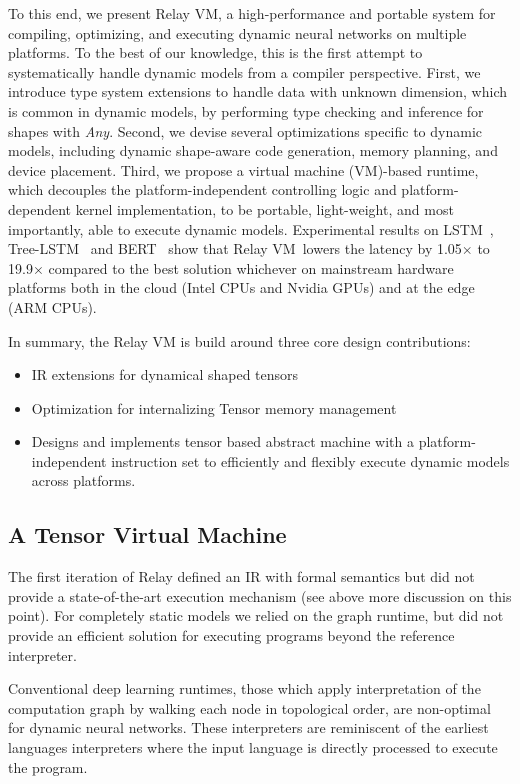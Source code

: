 To this end, we present Relay VM, a high-performance and portable system for compiling, optimizing,
  and executing dynamic neural networks on multiple platforms.
To the best of our knowledge, this is the first attempt to systematically handle dynamic models from a compiler perspective.
First, we introduce type system extensions to handle data with unknown dimension,
  which is common in dynamic models,
  by performing type checking and inference for shapes with {\em Any}.
Second, we devise several optimizations specific to dynamic models,
  including dynamic shape-aware code generation,
  memory planning, and device placement.
Third, we propose a virtual machine (VM)-based runtime,
  which decouples the platform-independent controlling logic and platform-dependent kernel implementation,
  to be portable, light-weight, and most importantly, able to execute dynamic models.
Experimental results on LSTM~\citep{lstm}, Tree-LSTM~\citep{tree_lstm} and BERT~\citep{devlin2018bert}
  show that Relay VM~lowers the latency by 1.05$\times$ to 19.9$\times$ compared to the best solution whichever
  on mainstream hardware platforms both in the cloud (Intel CPUs and Nvidia GPUs) and at the edge (ARM CPUs).

In summary, the Relay VM is build around three core design contributions:
\begin{itemize}
  \item IR extensions for dynamical shaped tensors
  \item Optimization for internalizing Tensor memory management
  \item Designs and implements tensor based abstract machine with a platform-independent instruction set to efficiently and flexibly execute dynamic models across platforms.
\end{itemize}

\subsection{A Tensor Virtual Machine}

The first iteration of Relay defined an IR with formal semantics
  but did not provide a state-of-the-art execution mechanism (see above more discussion on this point).
For completely static models we relied on the graph runtime,
  but did not provide an efficient solution for executing
  programs beyond the reference interpreter.

Conventional deep learning runtimes, those which apply interpretation of the
  computation graph by walking each node in topological order, are non-optimal
  for dynamic neural networks.
These interpreters are reminiscent of the earliest
  languages interpreters where the input language is directly
  processed to execute the program.

